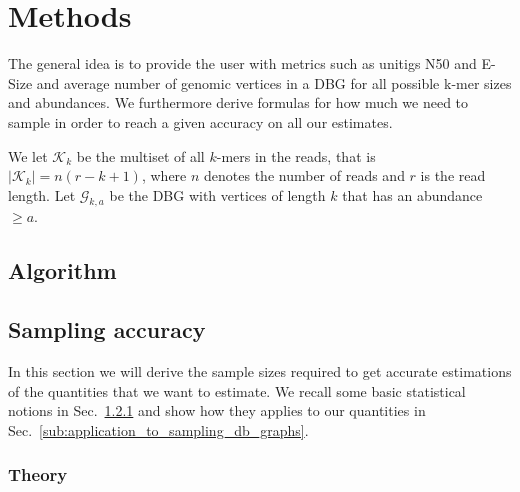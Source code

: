 \documentclass[a4paper,11pt]{article}
\newcommand{\kristoffer}[1]{{\color{red}{#1}}}
\begin{document}
\section{Methods} %
\label{sec:methods}

The general idea is to provide the user with metrics such as unitigs N50 and E-Size and average number of genomic vertices in a DBG  for all possible k-mer sizes and abundances. \kristoffer{ We implement a FM-index data structure described in cite XX. This allows us to query a k-mer, its in and out neighbors in O() time. }  We furthermore derive formulas for how much we need to sample in order to reach a given accuracy on all our estimates. 

We let $\mathcal{K}_k$ be the multiset of all $k$-mers in the reads, that is $|\mathcal{K}_k| = n(r-k+1)$, where $n$ denotes the number of reads and $r$ is the read length. Let $\mathcal{G}_{k,a}$ be the DBG with vertices of length $k$ that has an abundance $\geq a$.

\subsection{Algorithm} %
\label{sub:algorithm}


\subsection{Sampling accuracy}

In this section we will derive the sample sizes required to get accurate estimations of the quantities that we want to estimate. We recall some basic statistical notions in Sec.~\ref{ssub:theory} and show how they applies to our quantities in Sec.~\ref{sub:application_to_sampling_db_graphs}. 



\subsubsection{Theory} %
\label{ssub:theory}


\end{document}
